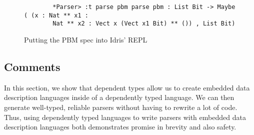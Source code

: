 \begin{figure}[ht]
    \caption{Putting the PBM spec into Idris' REPL}
    \label{repl}
    \begin{lstlisting}
        *Parser> :t parse pbm parse pbm : List Bit -> Maybe ( (x : Nat ** x1 :
        Nat ** x2 : Vect x (Vect x1 Bit) ** ()) , List Bit)
    \end{lstlisting}
\end{figure}

\subsection{Comments}

In this section, we show that dependent types allow us to create embedded data
description languages inside of a dependently typed language. We can then
generate well-typed, reliable parsers without having to rewrite a lot of code.
Thus, using dependently typed languages to write parsers with embedded data
description languages both demonstrates promise in brevity and also safety. 